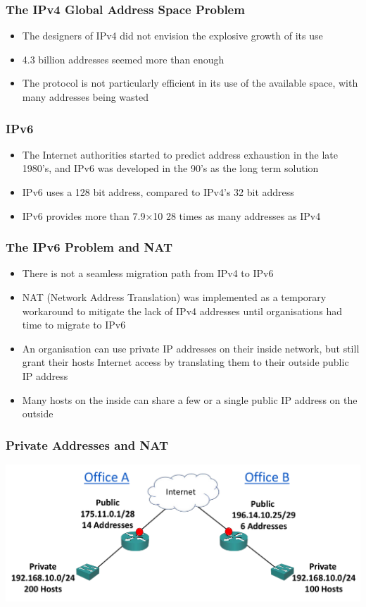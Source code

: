 \documentclass[pdflatex,compress]{beamer}
\begin{document}
\begin{frame}
	\frametitle{The IPv4 Global Address Space Problem}
	\begin{itemize}
		\item The designers of IPv4 did not envision the explosive growth of its use
		\item 4.3 billion addresses seemed more than enough
		\item The protocol is not particularly efficient in its use of the available space, with many addresses being wasted
	\end{itemize}
\end{frame}

\begin{frame}
	\frametitle{IPv6}
	\begin{itemize}
		\item The Internet authorities started to predict address exhaustion in the late 1980’s, and IPv6 was developed in the 90’s as the long term solution
		\item IPv6 uses a 128 bit address, compared to IPv4’s 32 bit address
		\item IPv6 provides more than 7.9×10 28 times as many addresses as IPv4
	\end{itemize}
\end{frame}

\begin{frame}
	\frametitle{The IPv6 Problem and NAT}
	\begin{itemize}
		\item There is not a seamless migration path from IPv4 to IPv6
		\item NAT (Network Address Translation) was implemented as a temporary workaround to mitigate the lack of IPv4 addresses until organisations had time to migrate to IPv6
		\item An organisation can use private IP addresses on their inside network, but still grant their hosts Internet access by translating them to their outside public IP address
		\item Many hosts on the inside can share a few or a single public IP address on the outside
	\end{itemize}
\end{frame}

\begin{frame}
	\frametitle{Private Addresses and NAT}
	\begin{center}
		\includegraphics[width=\linewidth]{img/img29}
	\end{center}
\end{frame}
\end{document}
